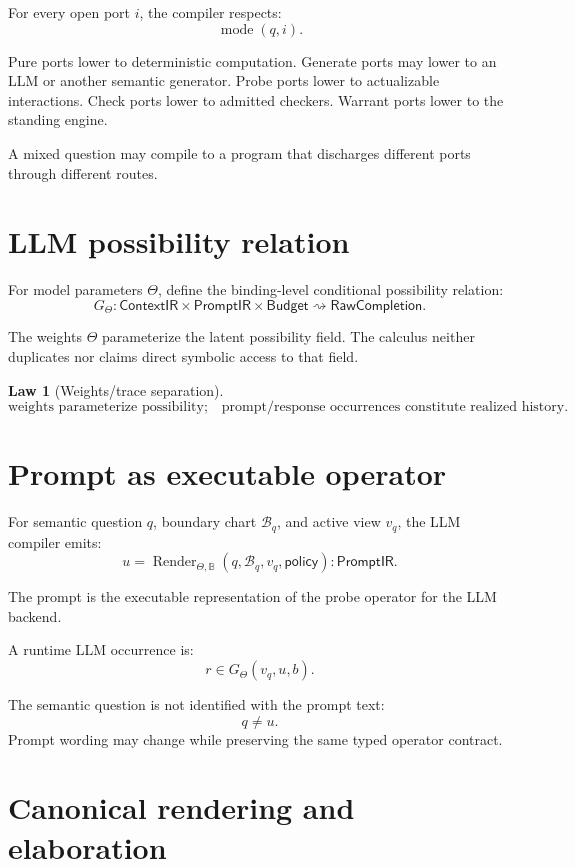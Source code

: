 \documentclass[11pt,oneside]{article}
\newtheorem{law}[definition]{Law}
\newcommand{\B}{\mathbb B}
\newcommand{\PromptIR}{\mathsf{PromptIR}}
\newcommand{\Render}{\operatorname{Render}}
\begin{document}
For every open port \(i\), the compiler respects:
\[
\operatorname{mode}(q,i).
\]

Pure ports lower to deterministic computation.  Generate ports may lower to an LLM or another semantic generator.  Probe ports lower to actualizable interactions.  Check ports lower to admitted checkers.  Warrant ports lower to the standing engine.

A mixed question may compile to a program that discharges different ports through different routes.

\section{LLM possibility relation}

For model parameters \(\Theta\), define the binding-level conditional possibility relation:
\[
\boxed{
G_\Theta:
\mathsf{ContextIR}
\times
\PromptIR
\times
\mathsf{Budget}
\rightsquigarrow
\mathsf{RawCompletion}.
}
\]

The weights \(\Theta\) parameterize the latent possibility field.  The calculus neither duplicates nor claims direct symbolic access to that field.

\begin{law}[Weights/trace separation]
\[
\boxed{
\text{weights parameterize possibility;}
\quad
\text{prompt/response occurrences constitute realized history.}
}
\]
\end{law}

\section{Prompt as executable operator}

For semantic question \(q\), boundary chart \(\mathcal B_q\), and active view \(v_q\), the LLM compiler emits:
\[
\boxed{
u=
\Render_{\Theta,\B}(q,\mathcal B_q,v_q,\mathsf{policy})
:
\PromptIR.
}
\]

The prompt is the executable representation of the probe operator for the LLM backend.

A runtime LLM occurrence is:
\[
\boxed{
r
\in
G_\Theta(v_q,u,b).
}
\]

The semantic question is not identified with the prompt text:
\[
q\neq u.
\]
Prompt wording may change while preserving the same typed operator contract.

\section{Canonical rendering and elaboration}
\end{document}
